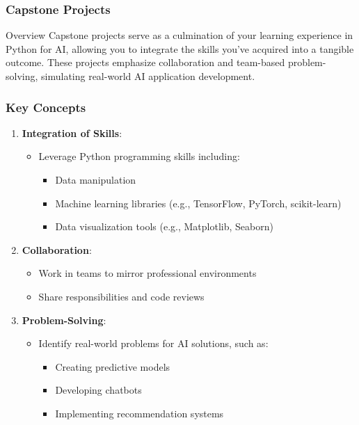 \documentclass[aspectratio=169]{beamer}
\begin{document}
\begin{frame}[fragile]
    \frametitle{Capstone Projects}
    \begin{block}{Overview}
        Capstone projects serve as a culmination of your learning experience in Python for AI, allowing you to integrate the skills you've acquired into a tangible outcome. These projects emphasize collaboration and team-based problem-solving, simulating real-world AI application development.
    \end{block}
\end{frame}

\begin{frame}[fragile]
    \frametitle{Key Concepts}
    \begin{enumerate}
        \item \textbf{Integration of Skills}:
        \begin{itemize}
            \item Leverage Python programming skills including:
            \begin{itemize}
                \item Data manipulation
                \item Machine learning libraries (e.g., TensorFlow, PyTorch, scikit-learn)
                \item Data visualization tools (e.g., Matplotlib, Seaborn)
            \end{itemize}
        \end{itemize}
        
        \item \textbf{Collaboration}:
        \begin{itemize}
            \item Work in teams to mirror professional environments
            \item Share responsibilities and code reviews
        \end{itemize}
        
        \item \textbf{Problem-Solving}:
        \begin{itemize}
            \item Identify real-world problems for AI solutions, such as:
            \begin{itemize}
                \item Creating predictive models
                \item Developing chatbots
                \item Implementing recommendation systems
            \end{itemize}
        \end{itemize}
    \end{enumerate}
\end{frame}
\end{document}
